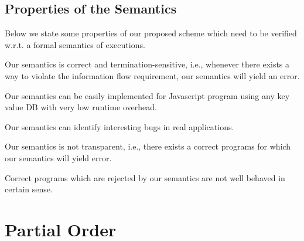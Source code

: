 \subsection{Properties of the Semantics}

Below we state some properties of our proposed scheme which need to be verified w.r.t.
a formal semantics of executions.

\begin{conj}
Our semantics is correct and termination-sensitive, i.e., whenever there exists
a way to violate the information flow requirement, our semantics will yield
an error.
\end{conj}

\begin{conj}
Our semantics can be easily implemented for Javascript program using
any key value DB with very low runtime overhead.
\end{conj}

\begin{conj}
Our semantics can identify interesting bugs in real applications.
\end{conj}

\begin{conj}
Our semantics is not transparent, i.e., there exists a correct programs for which our semantics
will yield error.
\end{conj}

\begin{conj}
Correct programs which are rejected by our semantics
are not well behaved in certain sense.
\end{conj}

\section{Partial Order}
